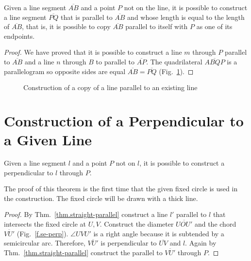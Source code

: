 \begin{theorem}
Given a line segment $\overline{AB}$ and a point $P$ not on the line, it is possible to construct a line segment $\overline{PQ}$ that is parallel to $\overline{AB}$ and whose length is equal to the length of $\overline{AB}$, that is, it is possible to copy $\overline{AB}$ parallel to itself with $P$ as one of its endpoints.
\end{theorem}

\begin{proof}
We have proved that it is possible to construct a line $m$ through $P$ parallel to $\overline{AB}$ and a line $n$ through $B$ to parallel to $\overline{AP}$. The quadrilateral $\overline{ABQP}$ is a parallelogram so opposite sides are equal $\overline{AB}=\overline{PQ}$ (Fig.~\ref{f.se-parallel-other4}).
\end{proof}

\begin{figure}[b]
\begin{center}
\end{center}
\caption{Construction of  a copy of a line parallel to an existing line}\label{f.se-parallel-other4}
\end{figure}

\section{Construction of a Perpendicular to a Given Line}\label{s.perp}

\begin{theorem}\label{thm.straight-perp}
Given a line segment $l$ and a point $P$ not on $l$, it is possible to construct a perpendicular to $l$ through $P$.
\end{theorem}

The proof of this theorem is the first time that the given fixed circle is used in the construction. The fixed circle will be drawn with a thick line.
\begin{proof}
By Thm.~\ref{thm.straight-parallel} construct a line $l'$ parallel to $l$ that intersects the fixed circle at $U,V$. Construct the diameter $\overline{UOU'}$ and the chord $\overline{VU'}$ (Fig.~\ref{f.se-perp}). $\angle UVU'$ is a right angle because it is subtended by a semicircular arc. Therefore, $\overline{VU'}$ is perpendicular to $\overline{UV}$ and $l$. Again by Thm.~\ref{thm.straight-parallel} construct the parallel to $\overline{VU'}$ through $P$.
\end{proof}

